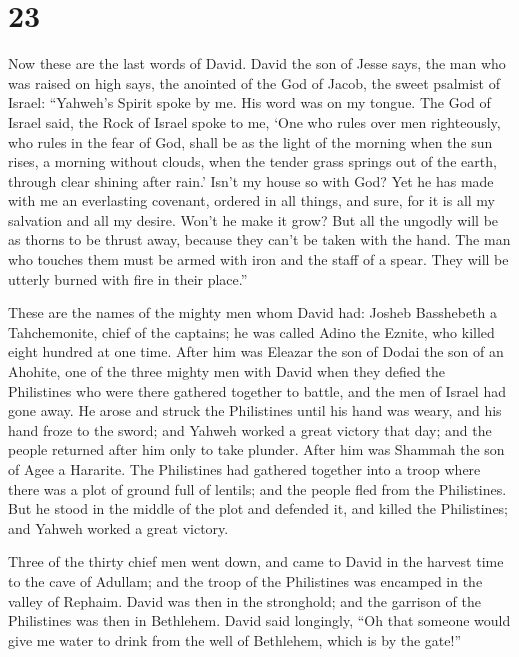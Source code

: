 \hypertarget{section-22}{%
\section{23}\label{section-22}}

 Now these are the last words of David. David the son of
Jesse says, the man who was raised on high says, the anointed of the God
of Jacob, the sweet psalmist of Israel:  ``Yahweh's Spirit
spoke by me. His word was on my tongue.  The God of Israel
said, the Rock of Israel spoke to me, `One who rules over men
righteously, who rules in the fear of God,  shall be as
the light of the morning when the sun rises, a morning without clouds,
when the tender grass springs out of the earth, through clear shining
after rain.'  Isn't my house so with God? Yet he has made
with me an everlasting covenant, ordered in all things, and sure, for it
is all my salvation and all my desire. Won't he make it grow?
 But all the ungodly will be as thorns to be thrust away,
because they can't be taken with the hand.  The man who
touches them must be armed with iron and the staff of a spear. They will
be utterly burned with fire in their place.''

 These are the names of the mighty men whom David had:
Josheb Basshebeth a Tahchemonite, chief of the captains; he was called
Adino the Eznite, who killed eight hundred at one time. 
After him was Eleazar the son of Dodai the son of an Ahohite, one of the
three mighty men with David when they defied the Philistines who were
there gathered together to battle, and the men of Israel had gone away.
 He arose and struck the Philistines until his hand was
weary, and his hand froze to the sword; and Yahweh worked a great
victory that day; and the people returned after him only to take
plunder.  After him was Shammah the son of Agee a
Hararite. The Philistines had gathered together into a troop where there
was a plot of ground full of lentils; and the people fled from the
Philistines.  But he stood in the middle of the plot and
defended it, and killed the Philistines; and Yahweh worked a great
victory.

 Three of the thirty chief men went down, and came to
David in the harvest time to the cave of Adullam; and the troop of the
Philistines was encamped in the valley of Rephaim.  David
was then in the stronghold; and the garrison of the Philistines was then
in Bethlehem.  David said longingly, ``Oh that someone
would give me water to drink from the well of Bethlehem, which is by the
gate!''

